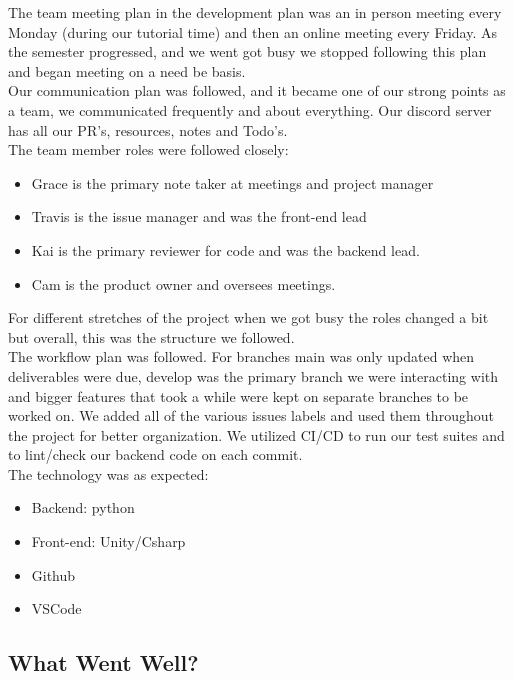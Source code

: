 \documentclass{article}
\begin{document}
\noindent The team meeting plan in the development plan was an in person meeting every Monday (during our tutorial time) and then an online meeting every Friday. As the semester progressed, and we went got busy we stopped following this plan and began meeting on a need be basis. \\
\noindent Our communication plan was followed, and it became one of our strong points as a team, we communicated frequently and about everything. Our discord server has all our PR’s, resources, notes and Todo’s. \\
\noindent The team member roles were followed closely:\\
\begin{itemize}
    \item Grace is the primary note taker at meetings and project manager
    \item Travis is the issue manager and was the front-end lead
    \item Kai is the primary reviewer for code and was the backend lead.
    \item Cam is the product owner and oversees meetings.
\end{itemize}
For different stretches of the project when we got busy the roles changed a bit but overall, this was the structure we followed.\\

\noindent The workflow plan was followed. For branches main was only updated when deliverables were due, develop was the primary branch we were interacting with and bigger features that took a while were kept on separate branches to be worked on. We added all of the various issues labels and used them throughout the project for better organization. We utilized CI/CD to run our test suites and to lint/check our backend code on each commit.\\

\noindent The technology was as expected:\\
\begin{itemize}
    \item Backend: python
    \item Front-end: Unity/Csharp
    \item Github
    \item VSCode
\end{itemize}

\subsection{What Went Well?}
\end{document}
